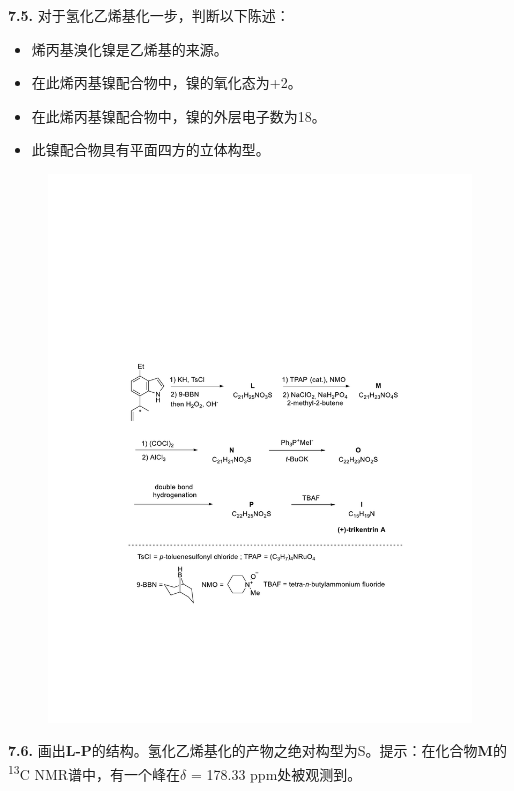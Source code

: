 \noindent\textbf{7.5.} 对于氢化乙烯基化一步，判断以下陈述：

\renewcommand{\labelitemi}{$\square$}
\begin{itemize}
\item 烯丙基溴化镍是乙烯基的来源。
\item 在此烯丙基镍配合物中，镍的氧化态为+2。
\item 在此烯丙基镍配合物中，镍的外层电子数为18。
\item 此镍配合物具有平面四方的立体构型。
\end{itemize}
\renewcommand{\labelitemi}{$\bullet$}

\begin{figure}[h!]
	\centering
	\includegraphics[width=14cm]{./pic/t7-5.pdf}
\end{figure}

\noindent\textbf{7.6.}
画出\textbf{L-P}的结构。氢化乙烯基化的产物之绝对构型为S。提示：在化合物\textbf{M}的\textsuperscript{13}C
NMR谱中，有一个峰在$\delta$ = 178.33 ppm处被观测到。


\textbf{\\
}
